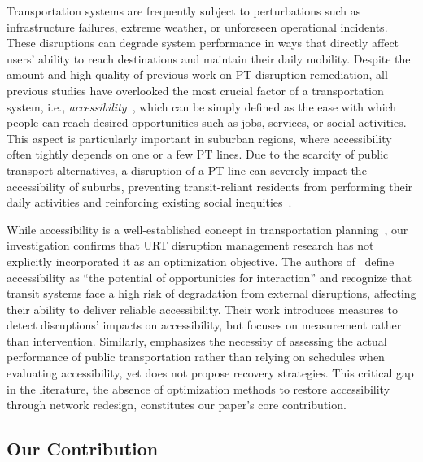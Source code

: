 \documentclass[3p,times,procedia]{elsarticle}
\begin{document}
Transportation systems are frequently subject to perturbations such as infrastructure failures, extreme weather, or unforeseen operational incidents. These disruptions can degrade system performance in ways that directly affect users’ ability to reach destinations and maintain their daily mobility.
Despite the amount and high quality of previous work on PT disruption remediation, all previous studies have overlooked the most crucial factor of a transportation system, i.e., \emph{accessibility}~\citep{hansen1959accessibility,miller2020measuring}, which can be simply defined as the ease with which people can reach desired opportunities such as jobs, services, or social activities. This aspect is particularly important in suburban regions, where accessibility often tightly depends on one or a few PT lines. Due to the scarcity of public transport alternatives, a disruption of a PT line can severely impact the accessibility of suburbs, preventing transit-reliant residents from performing their daily activities and reinforcing existing social inequities~\citep{lucas2012transport,karner2018assessing}.

While accessibility is a well-established concept in transportation planning~\citep{geurs2004accessibility,handy1997measuring,miller2020measuring}, our investigation confirms that URT disruption management research has not explicitly incorporated it as an optimization objective. The authors of~\citet{liu2024measuring} define accessibility as ``the potential of opportunities for interaction'' and recognize that transit systems face a high risk of degradation from external disruptions, affecting their ability to deliver reliable accessibility. Their work introduces measures to detect disruptions' impacts on accessibility, but focuses on measurement rather than intervention. Similarly, \citet{nalin2025evaluation} emphasizes the necessity of assessing the actual performance of public transportation rather than relying on schedules when evaluating accessibility, yet does not propose recovery strategies. 
%
This critical gap in the literature, the absence of optimization methods to restore accessibility through network redesign, constitutes our paper's core contribution.

\subsection{Our Contribution}\label{subsec:contribution}
\end{document}
